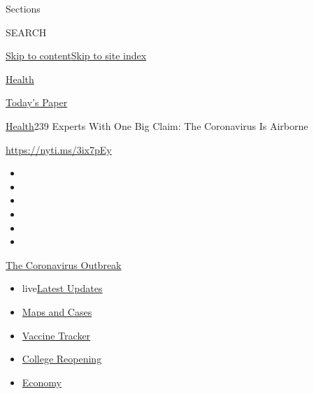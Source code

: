 Sections

SEARCH

\protect\hyperlink{site-content}{Skip to
content}\protect\hyperlink{site-index}{Skip to site index}

\href{https://www.nytimes3xbfgragh.onion/section/health}{Health}

\href{https://myaccount.nytimes3xbfgragh.onion/auth/login?response_type=cookie\&client_id=vi}{}

\href{https://www.nytimes3xbfgragh.onion/section/todayspaper}{Today's
Paper}

\href{/section/health}{Health}\textbar{}239 Experts With One Big Claim:
The Coronavirus Is Airborne

\url{https://nyti.ms/3ix7pEy}

\begin{itemize}
\item
\item
\item
\item
\item
\item
\end{itemize}

\href{https://www.nytimes3xbfgragh.onion/news-event/coronavirus?action=click\&pgtype=Article\&state=default\&region=TOP_BANNER\&context=storylines_menu}{The
Coronavirus Outbreak}

\begin{itemize}
\tightlist
\item
  live\href{https://www.nytimes3xbfgragh.onion/2020/08/04/world/coronavirus-cases.html?action=click\&pgtype=Article\&state=default\&region=TOP_BANNER\&context=storylines_menu}{Latest
  Updates}
\item
  \href{https://www.nytimes3xbfgragh.onion/interactive/2020/us/coronavirus-us-cases.html?action=click\&pgtype=Article\&state=default\&region=TOP_BANNER\&context=storylines_menu}{Maps
  and Cases}
\item
  \href{https://www.nytimes3xbfgragh.onion/interactive/2020/science/coronavirus-vaccine-tracker.html?action=click\&pgtype=Article\&state=default\&region=TOP_BANNER\&context=storylines_menu}{Vaccine
  Tracker}
\item
  \href{https://www.nytimes3xbfgragh.onion/2020/08/02/us/covid-college-reopening.html?action=click\&pgtype=Article\&state=default\&region=TOP_BANNER\&context=storylines_menu}{College
  Reopening}
\item
  \href{https://www.nytimes3xbfgragh.onion/live/2020/08/04/business/stock-market-today-coronavirus?action=click\&pgtype=Article\&state=default\&region=TOP_BANNER\&context=storylines_menu}{Economy}
\end{itemize}

